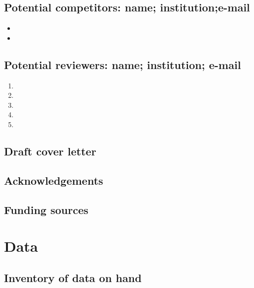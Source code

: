 \documentclass[11pt,letterpaper]{article}
\begin{document}
\subsection{Potential competitors: name; institution;e-mail}
\label{sec:org4616e75}


\begin{itemize}
\item 

\item 
\end{itemize}

\subsection{Potential reviewers: name; institution; e-mail}
\label{sec:org1a3c6b6}


\begin{enumerate}
\item 

\item 

\item 

\item 

\item 
\end{enumerate}

\subsection{Draft cover letter}
\label{sec:org9c2e134}



\subsection{Acknowledgements}
\label{sec:org408db1e}

\subsection{Funding sources}
\label{sec:org557a1fc}


\section{Data}
\label{sec:orgac118c3}
\subsection{Inventory of data on hand}
\label{sec:org8c8d121}
\end{document}
